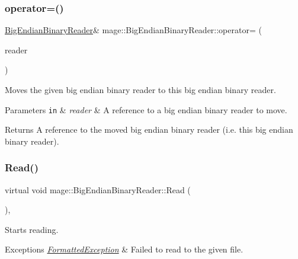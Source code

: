 \subsubsection{\texorpdfstring{operator=()}{operator=()}\hspace{0.1cm}{\footnotesize\ttfamily [2/2]}}
{\footnotesize\ttfamily \hyperlink{classmage_1_1_big_endian_binary_reader}{Big\+Endian\+Binary\+Reader}\& mage\+::\+Big\+Endian\+Binary\+Reader\+::operator= (\begin{DoxyParamCaption}\item[{\hyperlink{classmage_1_1_big_endian_binary_reader}{Big\+Endian\+Binary\+Reader} \&\&}]{reader }\end{DoxyParamCaption})\hspace{0.3cm}{\ttfamily [delete]}}

Moves the given big endian binary reader to this big endian binary reader.


\begin{DoxyParams}[1]{Parameters}
\mbox{\tt in}  & {\em reader} & A reference to a big endian binary reader to move. \\
\hline
\end{DoxyParams}
\begin{DoxyReturn}{Returns}
A reference to the moved big endian binary reader (i.\+e. this big endian binary reader). 
\end{DoxyReturn}
\hypertarget{classmage_1_1_big_endian_binary_reader_af072965dea0319d6366b21cc6562bbf9}{}\label{classmage_1_1_big_endian_binary_reader_af072965dea0319d6366b21cc6562bbf9} 
\subsubsection{\texorpdfstring{Read()}{Read()}}
{\footnotesize\ttfamily virtual void mage\+::\+Big\+Endian\+Binary\+Reader\+::\+Read (\begin{DoxyParamCaption}{ }\end{DoxyParamCaption})\hspace{0.3cm}{\ttfamily [private]}, {}}

Starts reading.


\begin{DoxyExceptions}{Exceptions}
{\em \hyperlink{structmage_1_1_formatted_exception}{Formatted\+Exception}} & Failed to read to the given file. \\
\hline
\end{DoxyExceptions}


